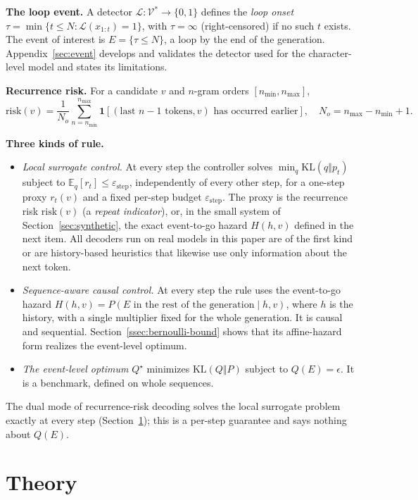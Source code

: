 \documentclass[11pt]{article}
\newcommand{\risk}{\mathrm{risk}}
\newcommand{\KL}{\mathrm{KL}}
\newcommand{\E}{\mathbb{E}}
\begin{document}
\textbf{The loop event.} A detector $\mathcal{L}:\mathcal{V}^{*}\to\{0,1\}$ defines the \emph{loop onset} $\tau=\min\{t\le N:\mathcal{L}(x_{1:t})=1\}$, with $\tau=\infty$ (right-censored) if no such $t$ exists. The event of interest is $E=\{\tau\le N\}$, a loop by the end of the generation. Appendix~\ref{sec:event} develops and validates the detector used for the character-level model and states its limitations.

\textbf{Recurrence risk.} For a candidate $v$ and $n$-gram orders $[n_{\min},n_{\max}]$,
\[
  \risk(v)=\frac{1}{N_o}\sum_{n=n_{\min}}^{n_{\max}}\mathbf{1}[(\text{last } n{-}1 \text{ tokens},v)\text{ has occurred earlier}],\quad N_o=n_{\max}-n_{\min}+1.
\]

\textbf{Three kinds of rule.}
\begin{itemize}[leftmargin=*]
  \item \emph{Local surrogate control.} At every step the controller solves $\min_q\KL(q\Vert p_t)$ subject to $\E_q[r_t]\le\varepsilon_{\text{step}}$, independently of every other step, for a one-step proxy $r_t(v)$ and a fixed per-step budget $\varepsilon_{\text{step}}$. The proxy is the recurrence risk $\risk(v)$ (a \emph{repeat indicator}), or, in the small system of Section~\ref{sec:synthetic}, the exact event-to-go hazard $H(h,v)$ defined in the next item. All decoders run on real models in this paper are of the first kind or are history-based heuristics that likewise use only information about the next token.
  \item \emph{Sequence-aware causal control.} At every step the rule uses the event-to-go hazard $H(h,v)=P(E\text{ in the rest of the generation}\mid h,v)$, where $h$ is the history, with a single multiplier fixed for the whole generation. It is causal and sequential. Section~\ref{ssec:bernoulli-bound} shows that its affine-hazard form realizes the event-level optimum.
  \item \emph{The event-level optimum} $Q^\star$ minimizes $\KL(Q\Vert P)$ subject to $Q(E)=\epsilon$. It is a benchmark, defined on whole sequences.
\end{itemize}
The dual mode of recurrence-risk decoding solves the local surrogate problem exactly at every step (Section~\ref{sec:theory}); this is a per-step guarantee and says nothing about $Q(E)$.

\section{Theory}
\label{sec:theory}
\end{document}
